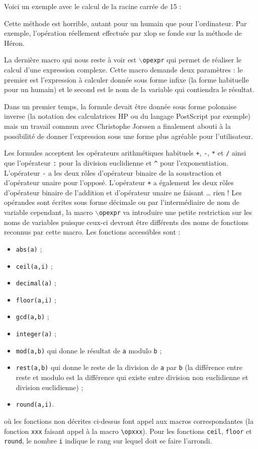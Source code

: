 \documentclass[12pt]{report}
\makeatletter
\newcommand\package[1]{\textsf{#1}}
\newcommand\macro[1]{\texttt{$\backslash$#1}\index{#1@\texttt{\boi {#1}}}}
\makeatother
\begin{document}
Voici un exemple avec le calcul de la racine carrée de 15 :
\begin{CenterExample}
\end{CenterExample}
Cette méthode est horrible, autant pour un humain que pour
l'ordinateur. Par exemple, l'opération réellement effectuée par
\package{xlop} se fonde sur la méthode de Héron.

La dernière macro qui nous reste à voir est \macro{opexpr} qui permet
de réaliser le calcul d'une expression complexe. Cette macro demande
deux paramètres : le premier est l'expression à calculer donnée sous
forme infixe (la forme habituelle pour un humain) et le second est le
nom de la variable qui contiendra le résultat.

Dans un premier temps, la formule devait être donnée sous forme
polonaise inverse (la notation des calculatrices HP ou du langage
PostScript par exemple) mais un travail commun avec Christophe Jorssen
a finalement abouti à la possibilité de donner l'expression sous une
forme plus agréable pour l'utilisateur.

Les formules acceptent les opérateurs arithmétiques habituels
\texttt{+}, \texttt{-}, \texttt{*} et \texttt{/} ainsi que l'opérateur
\texttt{:} pour la division euclidienne et \verb+^+ pour
l'exponentiation. L'opérateur \texttt{-} a les deux rôles d'opérateur
binaire de la soustraction et d'opérateur unaire pour l'opposé.
L'opérateur \texttt{+} a également les deux rôles d'opérateur binaire
de l'addition et d'opérateur unaire ne faisant \ldots{} rien ! Les
opérandes sont écrites sous forme décimale ou par l'intermédiaire de
nom de variable cependant, la macro \macro{opexpr} va introduire une
petite restriction sur les noms de variables puisque ceux-ci devront
être différents des noms de fonctions reconnus par cette macro. Les
fonctions accessibles sont :
\begin{itemize}
\item \texttt{abs(a)} ;
\item \texttt{ceil(a,i)} ;
\item \texttt{decimal(a)} ;
\item \texttt{floor(a,i)} ;
\item \texttt{gcd(a,b)} ;
\item \texttt{integer(a)} ;
\item \texttt{mod(a,b)} qui donne le résultat de \texttt{a} modulo
  \texttt{b} ;
\item \texttt{rest(a,b)} qui donne le reste de la division de
  \texttt{a} par \texttt{b} (la différence entre reste et modulo est
  la différence qui existe entre division non euclidienne et division
  euclidienne) ;
\item \texttt{round(a,i)}.
\end{itemize}
où les fonctions non décrites ci-dessus font appel aux macros
correspondantes (la fonction \texttt{xxx} faisant appel à la macro
\verb+\opxxx+). Pour les fonctions \texttt{ceil}, \texttt{floor} et
\texttt{round}, le nombre \texttt{i} indique le rang sur lequel doit
se faire l'arrondi.
\end{document}
